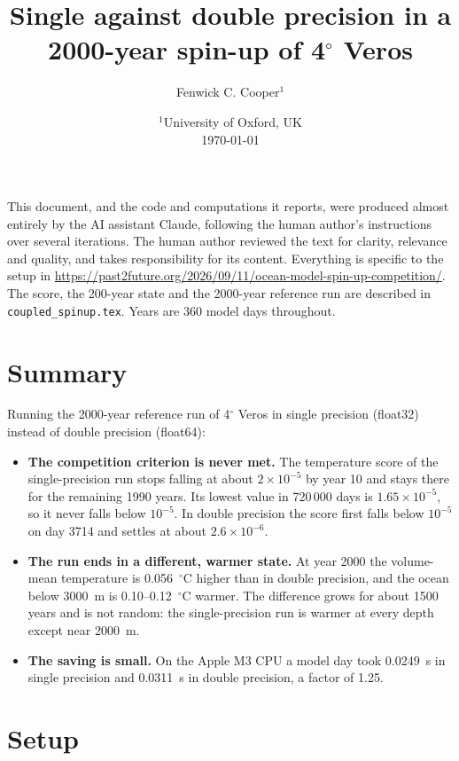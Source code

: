 \documentclass{article}
\title{Single against double precision in a 2000-year spin-up of 4$^\circ$ Veros}
\author{Fenwick C. Cooper$^1$}
\date{%
    $^1$University of Oxford, UK \\[2ex]
    \today
}
\begin{document}
\maketitle

This document, and the code and computations it reports, were produced almost entirely by the AI assistant Claude, following the human author's instructions over several iterations. The human author reviewed the text for clarity, relevance and quality, and takes responsibility for its content. Everything is specific to the setup in \url{https://past2future.org/2026/09/11/ocean-model-spin-up-competition/}.
The score, the 200-year state and the 2000-year reference run are described in \texttt{coupled\_spinup.tex}. Years are 360 model days throughout.

\section{Summary}\label{sec:summary}

Running the 2000-year reference run of 4$^\circ$ Veros in single precision (float32) instead of double precision (float64):
\begin{itemize}
\item \textbf{The competition criterion is never met.} The temperature score of the single-precision run stops falling at about $2\times10^{-5}$ by year 10 and stays there for the remaining 1990 years. Its lowest value in 720\,000 days is $1.65\times10^{-5}$, so it never falls below $10^{-5}$. In double precision the score first falls below $10^{-5}$ on day 3714 and settles at about $2.6\times10^{-6}$.
\item \textbf{The run ends in a different, warmer state.} At year 2000 the volume-mean temperature is 0.056~$^\circ$C higher than in double precision, and the ocean below 3000~m is 0.10--0.12~$^\circ$C warmer. The difference grows for about 1500 years and is not random: the single-precision run is warmer at every depth except near 2000~m.
\item \textbf{The saving is small.} On the Apple M3 CPU a model day took 0.0249~s in single precision and 0.0311~s in double precision, a factor of 1.25.
\end{itemize}

\section{Setup}\label{sec:setup}
\end{document}
